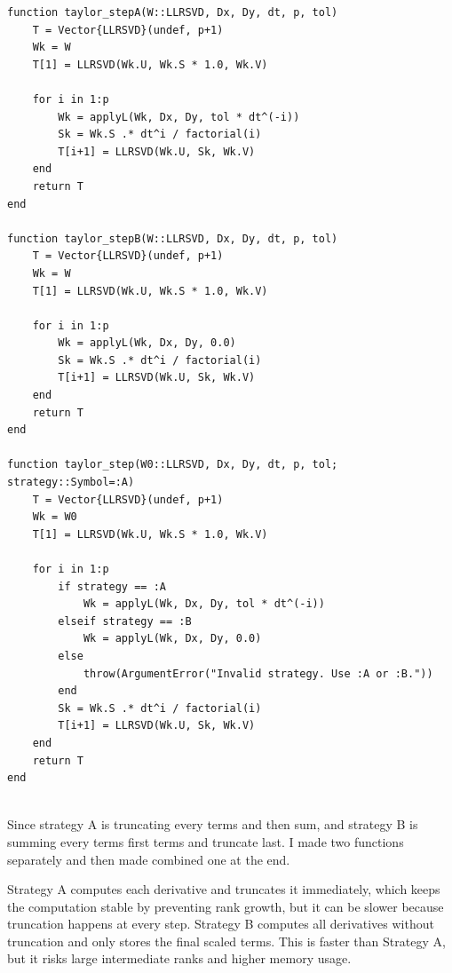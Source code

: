 \documentclass[11pt]{report}
\begin{document}
\begin{lstlisting}
function taylor_stepA(W::LLRSVD, Dx, Dy, dt, p, tol)
    T = Vector{LLRSVD}(undef, p+1)
    Wk = W
    T[1] = LLRSVD(Wk.U, Wk.S * 1.0, Wk.V)

    for i in 1:p
        Wk = applyL(Wk, Dx, Dy, tol * dt^(-i))
        Sk = Wk.S .* dt^i / factorial(i)
        T[i+1] = LLRSVD(Wk.U, Sk, Wk.V)
    end
    return T
end

function taylor_stepB(W::LLRSVD, Dx, Dy, dt, p, tol)
    T = Vector{LLRSVD}(undef, p+1)
    Wk = W
    T[1] = LLRSVD(Wk.U, Wk.S * 1.0, Wk.V)

    for i in 1:p
        Wk = applyL(Wk, Dx, Dy, 0.0)
        Sk = Wk.S .* dt^i / factorial(i)
        T[i+1] = LLRSVD(Wk.U, Sk, Wk.V)
    end
    return T
end

function taylor_step(W0::LLRSVD, Dx, Dy, dt, p, tol; strategy::Symbol=:A)
    T = Vector{LLRSVD}(undef, p+1)
    Wk = W0
    T[1] = LLRSVD(Wk.U, Wk.S * 1.0, Wk.V)

    for i in 1:p
        if strategy == :A
            Wk = applyL(Wk, Dx, Dy, tol * dt^(-i))
        elseif strategy == :B
            Wk = applyL(Wk, Dx, Dy, 0.0)
        else
            throw(ArgumentError("Invalid strategy. Use :A or :B."))
        end
        Sk = Wk.S .* dt^i / factorial(i)
        T[i+1] = LLRSVD(Wk.U, Sk, Wk.V)
    end
    return T
end


\end{lstlisting}

Since strategy A is truncating every terms and then sum, and strategy B is summing every terms first terms and truncate last. I made two functions separately and then made combined one at the end. 

\vspace{0.8em}

Strategy A computes each derivative and truncates it immediately, which keeps the computation stable by preventing rank growth, but it can be slower because truncation happens at every step.
Strategy B computes all derivatives without truncation and only stores the final scaled terms. This is faster than Strategy A, but it risks large intermediate ranks and higher memory usage.
\end{document}
